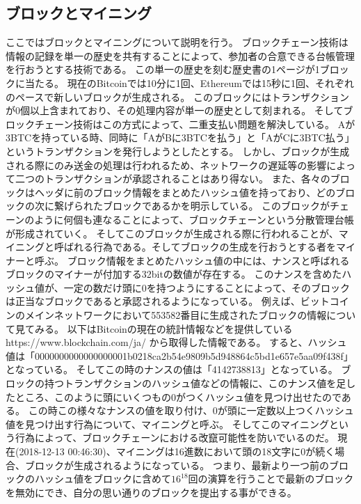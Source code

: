 \subsection{ブロックとマイニング}
ここではブロックとマイニングについて説明を行う。
ブロックチェーン技術は情報の記録を単一の歴史を共有することによって、参加者の合意できる台帳管理を行おうとする技術である。
この単一の歴史を刻む歴史書の1ページが1ブロックに当たる。
現在のBitcoinでは10分に1回、Ethereumでは15秒に1回、それぞれのペースで新しいブロックが生成される。
このブロックにはトランザクションが0個以上含まれており、その処理内容が単一の歴史として刻まれる。
そしてブロックチェーン技術はこの方式によって、二重支払い問題を解決している。
Aが3BTCを持っている時、同時に「AがBに3BTCを払う」と「AがCに3BTC払う」というトランザクションを発行しようとしたとする。
しかし、ブロックが生成される際にのみ送金の処理は行われるため、ネットワークの遅延等の影響によって二つのトランザクションが承認されることはあり得ない。
また、各々のブロックはヘッダに前のブロック情報をまとめたハッシュ値を持っており、どのブロックの次に繋げられたブロックであるかを明示している。
このブロックがチェーンのように何個も連なることによって、ブロックチェーンという分散管理台帳が形成されていく。
そしてこのブロックが生成される際に行われることが、マイニングと呼ばれる行為である。そしてブロックの生成を行おうとする者をマイナーと呼ぶ。
ブロック情報をまとめたハッシュ値の中には、ナンスと呼ばれるブロックのマイナーが付加する32bitの数値が存在する。
このナンスを含めたハッシュ値が、一定の数だけ頭に0を持つようにすることによって、そのブロックは正当なブロックであると承認されるようになっている。
例えば、ビットコインのメインネットワークにおいて553582番目に生成されたブロックの情報について見てみる。
以下はBitcoinの現在の統計情報などを提供しているhttps://www.blockchain.com/ja/ から取得した情報である。
すると、ハッシュ値は「0000000000000000001b0218ca2b54e9809b5d948864c5bd1e657e5aa09f438f」となっている。
そしてこの時のナンスの値は「4142738813」となっている。
ブロックの持つトランザクションのハッシュ値などの情報に、このナンス値を足したところ、このように頭にいくつもの0がつくハッシュ値を見つけ出せたのである。
この時この様々なナンスの値を取り付け、0が頭に一定数以上つくハッシュ値を見つけ出す行為について、マイニングと呼ぶ。
そしてこのマイニングという行為によって、ブロックチェーンにおける改竄可能性を防いでいるのだ。
現在(2018-12-13 00:46:30)、マイニングは16進数において頭の18文字に0が続く場合、ブロックが生成されるようになっている。
つまり、最新より一つ前のブロックのハッシュ値をブロックに含めて\(16^18\)回の演算を行うことで最新のブロックを無効にでき、自分の思い通りのブロックを提出する事ができる。
